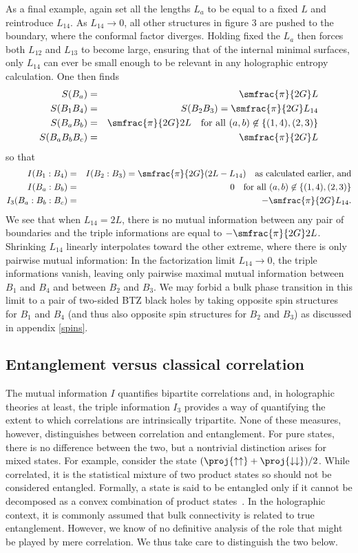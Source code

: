 \documentclass[12pt]{article}
\newcommand{\beq}{\begin{eqnarray}}
\newcommand{\eeq}{\end{eqnarray}}
\numberwithin{equation}{section}
\begin{document}
As a final example, again set all the lengths $L_a$ to be equal to a fixed $L$ and reintroduce $L_{14}$. As $L_{14} \rightarrow 0$, all other structures in figure 3 are pushed to the boundary, where the conformal factor diverges.  Holding fixed the $L_a$ then forces both $L_{12}$ and $L_{13}$ to become large, ensuring that of the internal minimal surfaces, only $L_{14}$ can ever be small enough to be relevant in any holographic entropy calculation.
One then finds
\beq
S(B_a) &=& \smfrac{\pi}{2G} L \label{eqn:L14-one} \\
S(B_1 B_4) &=& S(B_2 B_3) = \smfrac{\pi}{2G} L_{14} \\
S(B_a B_b ) &=& \smfrac{\pi}{2G} 2L \quad \text{for all } (a,b) \not\in \{(1,4),(2,3)\} \\
S(B_a B_b B_c ) &=& \smfrac{\pi}{2G} L \label{eqn:L14-four}
\eeq
so that
\beq
I(B_1:B_4) &=& I(B_2:B_3) = \smfrac{\pi}{2G}( 2L - L_{14})
	\quad \text{as calculated earlier, and} \\
I(B_a : B_b) &=& 0 \quad \text{for all } (a,b) \not\in \{(1,4),(2,3)\} \\
I_3(B_a : B_b : B_c ) &=& - \smfrac{\pi}{2G} L_{14}.
\eeq
We see that when $L_{14} = 2L$, there is no mutual information between any pair of
boundaries and the triple informations are equal to $-\smfrac{\pi}{2G}2L$. Shrinking $L_{14}$ linearly interpolates toward the other extreme, where there is only pairwise mutual information:  In the factorization limit $L_{14} \rightarrow 0$, the triple informations vanish, leaving only pairwise maximal mutual information between $B_1$ and $B_4$ and between $B_2$ and $B_3$. We may forbid a bulk phase transition in this limit to a pair of two-sided BTZ black holes by taking opposite spin structures for $B_1$ and $B_4$ (and thus also opposite spin structures for $B_2$ and $B_3$) as discussed in appendix \ref{spins}.


%
\subsection{Entanglement versus classical correlation}
%
\label{sec:entang-measures}

The mutual information $I$ quantifies bipartite correlations and, in holographic theories at least, the triple information $I_3$ provides a way of quantifying the extent to which correlations are intrinsically tripartite. None of these measures, however, distinguishes between correlation and entanglement. For pure states, there is no difference between the two, but a nontrivial distinction arises for mixed states. For example, consider the state $(\proj{\uparrow \uparrow} + \proj{\downarrow \downarrow})/2$. While correlated, it is the statistical mixture of two product states so should not be considered entangled. Formally, a state is said to be entangled only if it cannot be decomposed as a convex combination of product states~\cite{werner1989quantum,bennett1996mixed}.
In the holographic context, it is commonly assumed that bulk connectivity is related to true entanglement.  However, we know of no definitive analysis of the role that might be played by mere correlation.  We thus take care to distinguish the two below.
\end{document}

